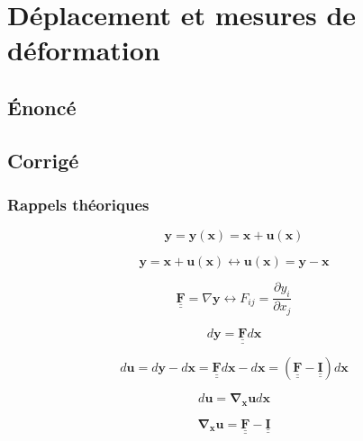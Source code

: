 \documentclass
[
a4paper,                      %
twoside,					  %
12pt,                         %
abstract,		      %
fleqn,                        %
]
{scrartcl} %
\begin{document}
\section{D\'eplacement et mesures de d\'eformation}

\subsection{\'Enonc\'e}

\newpage

\subsection{Corrig\'e}

\subsubsection{Rappels th\'eoriques}

\begin{equation}
\mathbf{y}=\mathbf{y}\left(\mathbf{x}\right)=\mathbf{x}+\mathbf{u}\left(\mathbf{x}\right)
\end{equation}

\begin{equation}
\mathbf{y}=\mathbf{x}+\mathbf{u}\left(\mathbf{x}\right)\longleftrightarrow\mathbf{u}\left(\mathbf{x}\right)=\mathbf{y}-\mathbf{x}
\end{equation}

\begin{equation}
\mathbf{\underline{\underline{F}}}=\nabla\mathbf{y}\longleftrightarrow F_{ij}=\frac{\partial y_{i}}{\partial x_{j}}
\end{equation}

\begin{equation}
d\mathbf{y}=\mathbf{\underline{\underline{F}}}d\mathbf{x}
\end{equation}

\begin{equation}
d\mathbf{u}=d\mathbf{y}-d\mathbf{x}=\mathbf{\underline{\underline{F}}}d\mathbf{x}-d\mathbf{x}=\left(\mathbf{\underline{\underline{F}}}-\mathbf{\underline{\underline{I}}}\right)d\mathbf{x}
\end{equation}

\begin{equation}
d\mathbf{u}=\mathbf{\nabla_{x}u}d\mathbf{x}
\end{equation}

\begin{equation}
\mathbf{\nabla_{x}u}=\mathbf{\underline{\underline{F}}}-\mathbf{\underline{\underline{I}}}
\end{equation}
\end{document}
